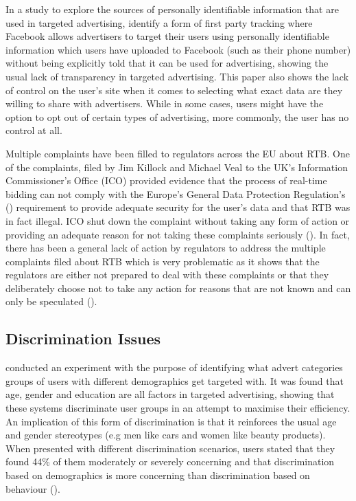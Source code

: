 \documentclass{l4proj}
\begin{document}
In a study to explore the sources of personally identifiable information that are used in targeted advertising, \cite{Venkatadri2019} identify a form of first party tracking where Facebook allows advertisers to target their users using personally identifiable information which users have uploaded to Facebook (such as their phone number) without being explicitly told that it can be used for advertising, showing the usual lack of transparency in targeted advertising. This paper also shows the lack of control on the user's site when it comes to selecting what exact data are they willing to share with advertisers. While in some cases, users might have the option to opt out of certain types of advertising, more commonly, the user has no control at all.

Multiple complaints have been filled to regulators across the EU about RTB. One of the complaints, filed by Jim Killock and Michael Veal to the UK's Information Commissioner's Office (ICO) provided evidence that the process of real-time bidding can not comply with the Europe’s General Data Protection Regulation's (\cite{gdpr}) requirement to provide adequate security for the user's data and that RTB was in fact illegal. ICO shut down the complaint without taking any form of action or providing an adequate reason for not taking these complaints seriously (\cite{rtbcomplaint}). In fact, there has been a general lack of action by regulators to address the multiple complaints filed about RTB which is very problematic as it shows that the regulators are either not prepared to deal with these complaints or that they deliberately choose not to take any action for reasons that are not known and can only be speculated (\cite{report}).

\subsection{Discrimination Issues}
\cite{Bol2019a} conducted an experiment with the purpose of identifying what advert categories groups of users with different demographics get targeted with. It was found that age, gender and education are all factors in targeted advertising, showing that these systems discriminate user groups in an attempt to maximise their efficiency. An implication of this form of discrimination is that it reinforces the usual age and gender stereotypes (e.g men like cars and women like beauty products). When presented with different discrimination scenarios, users stated that they found 44\% of them moderately or severely concerning and that discrimination based on demographics is more concerning than discrimination based on behaviour (\cite{Plane2017}).
\end{document}
